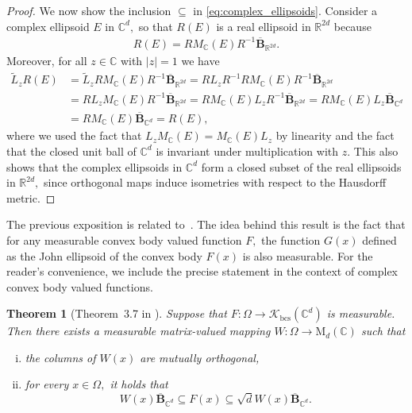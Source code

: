 \documentclass{article}
\newtheorem{theorem}{Theorem}
\theoremstyle{definition}
\theoremstyle{remark}
\numberwithin{equation}{section}
\newcommand{\cK}{\mathcal{K}}
\newcommand{\reals}{\mathbb{R}}
\newcommand{\complex}{\mathbb{C}}
\newcommand{\convex}{\cK_{\mathrm{bcs}}}
\newcommand{\1}{\mathbf{1}}
\newcommand{\matrices}[2]{\mathrm{M}_{{#1}}({#2})}
\begin{document}
\begin{proof}
	We now show the inclusion $\subseteq$ in \eqref{eq:complex_ellipsoids}. Consider a complex ellipsoid $E$ in $\complex^{d},$ so that $R(E)$ is a real ellipsoid in $\reals^{2d}$ because
	\begin{align*}
		R(E) = RM_{\complex}(E)R^{-1}\mathbf{\overline{B}}_{\reals^{2d}}.
	\end{align*}
    Moreover, for all $z\in\complex$ with $|z|=1$ we have
     \begin{align*}
     	\widetilde{L}_{z}R(E) &= \widetilde{L}_{z}RM_{\complex}(E)R^{-1}\mathbf{\overline{B}}_{\reals^{2d}} = RL_{z}R^{-1}RM_{\complex}(E)R^{-1}\mathbf{\overline{B}}_{\reals^{2d}}\\
     	&= RL_{z}M_{\complex}(E)R^{-1}\mathbf{\overline{B}}_{\reals^{2d}} = RM_{\complex}(E)L_{z}R^{-1}\mathbf{\overline{B}}_{\reals^{2d}}
     	= RM_{\complex}(E)L_{z}\mathbf{\overline{B}}_{\complex^{d}}\\
     	&=
     	RM_{\complex}(E)\mathbf{\overline{B}}_{\complex^d} = R(E),
     \end{align*}
    where we used the fact that $L_{z}M_{\complex}(E) = M_{\complex}(E)L_{z}$ by linearity and the fact that the closed unit ball of $\complex^{d}$ is invariant under multiplication with $z.$
    This also shows that the complex ellipsoids in $\complex^d$ form a closed subset of the real ellipsoids in $\reals^{2d},$
    since orthogonal maps induce isometries with respect to the Hausdorff metric.
    \end{proof}
    
     The previous exposition is related to~\cite[Theorem~3.7]{Cruz_Uribe_Bownik_Extrapolation}.
    The idea behind this result is the fact that
    for any measurable convex body valued function $F,$
    the function $G(x)$ defined as the John ellipsoid of the convex body $F(x)$
    is also measurable.
    For the reader's convenience, we include the precise statement
    in the context of complex convex body valued functions.
    
    \begin{theorem}[Theorem~3.7 in \cite{Cruz_Uribe_Bownik_Extrapolation}]
        Suppose that $F\colon \Omega \rightarrow \convex(\complex^d)$ is measurable.
        Then there exists a measurable matrix-valued mapping $W\colon \Omega \rightarrow \matrices{d}{\complex}$ such that
        \begin{enumerate}[(i)]
            \item
            the columns of $W(x)$ are mutually orthogonal,
            \item 
            for every $x \in \Omega,$ it holds that
            \begin{equation*}
                W(x) \mathbf{\overline{B}}_{\complex^d} \subseteq F(x)
                \subseteq \sqrt{d} W(x) \mathbf{\overline{B}}_{\complex^d}.
            \end{equation*}
        \end{enumerate}
    \end{theorem}
\end{document}
